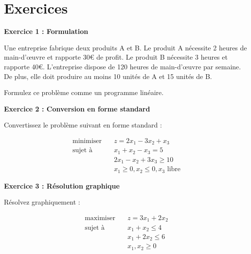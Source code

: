 \documentclass[12pt,a4paper]{article}
\begin{document}
\newpage
\section{Exercices}

\begin{exemple}
\textbf{Exercice 1 : Formulation}

Une entreprise fabrique deux produits A et B. Le produit A nécessite 2 heures de main-d'œuvre et rapporte 30€ de profit. Le produit B nécessite 3 heures et rapporte 40€. L'entreprise dispose de 120 heures de main-d'œuvre par semaine. De plus, elle doit produire au moins 10 unités de A et 15 unités de B.

Formulez ce problème comme un programme linéaire.
\end{exemple}

\begin{exemple}
\textbf{Exercice 2 : Conversion en forme standard}

Convertissez le problème suivant en forme standard :

\begin{align*}
\text{minimiser} \quad & z = 2x_1 - 3x_2 + x_3\\
\text{sujet à} \quad & x_1 + x_2 - x_3 = 5\\
& 2x_1 - x_2 + 3x_3 \geq 10\\
& x_1 \geq 0, x_2 \leq 0, x_3 \text{ libre}
\end{align*}
\end{exemple}

\begin{exemple}
\textbf{Exercice 3 : Résolution graphique}

Résolvez graphiquement :

\begin{align*}
\text{maximiser} \quad & z = 3x_1 + 2x_2\\
\text{sujet à} \quad & x_1 + x_2 \leq 4\\
& x_1 + 2x_2 \leq 6\\
& x_1, x_2 \geq 0
\end{align*}
\end{exemple}
\end{document}
